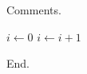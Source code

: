 \documentclass{article}
\begin{document}
Comments.

\begin{algorithm}[h]
\caption{Comments}
\begin{algorithmic}[1]
\State $i \gets 0$ 
\State $i \gets i + 1$
\EndWhile
\end{algorithmic}
\end{algorithm}

End.
\end{document}
